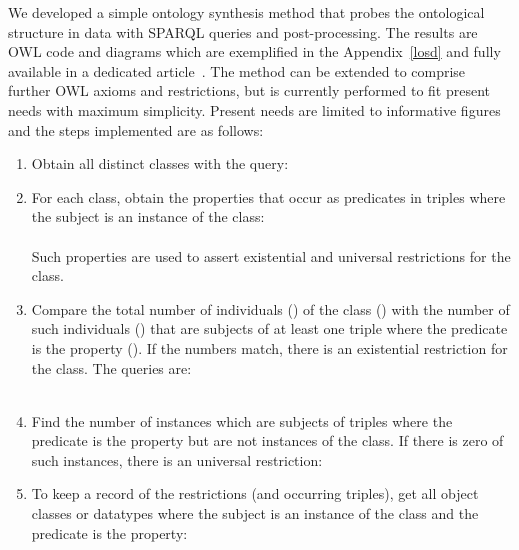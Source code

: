 We developed a simple ontology synthesis method that probes
the ontological structure in data with
SPARQL queries and post-processing.
The results are OWL code and diagrams which are 
exemplified in the Appendix~\ref{losd} and 
fully available in a dedicated article~\cite{losd}.
The method can be extended to comprise further OWL axioms and restrictions,
but is currently performed to fit present needs with maximum simplicity.
Present needs are limited to informative figures and
the steps implemented are as follows:
\begin{enumerate}[leftmargin=0cm]
	\item Obtain all distinct classes with the query:\\
	\item For each class, obtain the properties that occur as predicates in triples where the subject is an instance of the class:\\
		\\
					Such properties are used to assert existential and universal restrictions for the class.
				\item Compare the total number of individuals () of the class () with
					the number of such individuals () that are subjects of at least one triple where 
							the predicate is the property ().
								If the numbers match, there is an existential restriction for the class. The queries are:\\
									\\
										\item Find the number of instances which are subjects of triples where the predicate is the property but are not instances of the class.
											If there is zero of such instances, there is an universal restriction:\\
													\item To keep a record of the restrictions (and occurring triples), get all object classes or datatypes where the subject is an instance of the class and the predicate is the property:\\

\end{enumerate}
